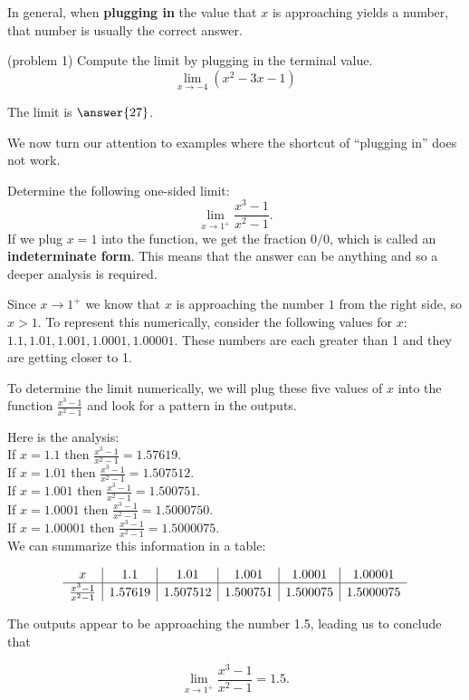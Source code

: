 \documentclass[handout]{ximera}
\begin{document}
In general, when \textbf{plugging in} the value that $x$ is approaching yields a number, 
that number is usually the correct answer.  



\begin{problem}(problem 1)
Compute the limit by plugging in the terminal value.
\[
\lim_{x \to -4} (x^2 -3x -1)
\]

The limit is $\answer{27}$.
\end{problem}

We now turn our attention to examples where the shortcut of ``plugging in'' does not work.

\begin{example}[example 2]
Determine the following one-sided limit: 
\[\lim_{x \to 1^{+}} \frac{x^3 - 1}{x^2 -1}.\]
If we plug $x = 1$ into the function, we get the fraction  $0/0$, which is called an \textbf{indeterminate form}. 
This means that the answer can be anything and so a deeper analysis is required.


Since  $x \to 1^{+}$ we know that $x$ is approaching the number $1$ from the right side, so $x > 1$. 
To represent this numerically, consider the following values for $x$: $1.1, 1.01, 1.001, 1.0001, 1.00001$.
These numbers are each greater than 1 and they are getting closer to 1.
 
To determine the limit numerically,  we will plug these five values of $x$ into the function $\frac{x^3 - 1}{x^2-1}$ and  
look for a pattern in the outputs.

Here is the analysis:\\
If $x = 1.1$ then $\displaystyle{\frac{x^3 - 1}{x^2-1}= 1.57619}$.\\
If $x = 1.01$ then $\displaystyle{\frac{x^3 - 1}{x^2-1} = 1.507512}$.\\
If $x = 1.001$ then $\displaystyle{\frac{x^3 - 1}{x^2-1}= 1.500751}$.\\
If $x = 1.0001$ then $\displaystyle{\frac{x^3 - 1}{x^2-1}= 1.5000750}$.\\
If $x = 1.00001$ then $\displaystyle{\frac{x^3 - 1}{x^2-1}= 1.5000075}$.\\

We can summarize this information in a table:
  
\[
\begin{array}{ c | c | c | c | c | c}
  x & 1.1 & 1.01 & 1.001 & 1.0001 & 1.00001\\ 
	\hline
	\frac{x^3 - 1}{x^2-1} & 1.57619 & 1.507512 & 1.500751 & 1.500075 & 1.5000075
\end{array}
\]


The outputs appear to be approaching the number 1.5, leading us to conclude that

\[\lim_{x \to 1^+} \frac{x^3 - 1}{x^2-1} = 1.5.\] 
 
 
\end{example}
\end{document}
